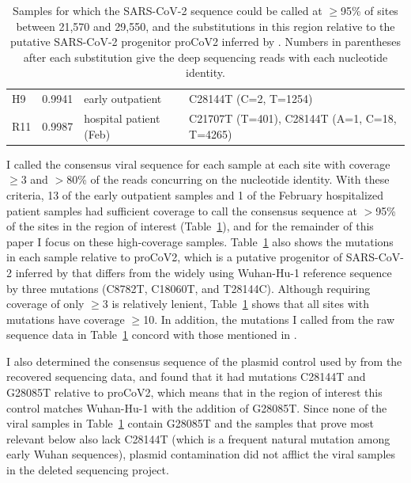 \documentclass[9pt,twocolumn,twoside]{gsajnl_modified}
\begin{document}
\begin{table}[]
{\begin{tabular}{lrll}
H9 &                               0.9941 &        early outpatient &                                                     C28144T (C=2, T=1254)  \\
R11 &                               0.9987 &  hospital patient (Feb) &                               C21707T (T=401), C28144T (A=1, C=18, T=4265)  \\
\bottomrule
\end{tabular}
}
\caption{Samples for which the SARS-CoV-2 sequence could be called at $\ge$95\% of sites between 21,570 and 29,550, and the substitutions in this region relative to the putative SARS-CoV-2 progenitor proCoV2 inferred by \citet{kumar2021evolutionary}.
Numbers in parentheses after each substitution give the deep sequencing reads with each nucleotide identity.
\label{tab:mutations}
}
\end{table}

I called the consensus viral sequence for each sample at each site with coverage $\ge$3 and $>$80\% of the reads concurring on the nucleotide identity.
With these criteria, 13 of the early outpatient samples and 1 of the February hospitalized patient samples had sufficient coverage to call the consensus sequence at $>$95\% of the sites in the region of interest (Table~\ref{tab:mutations}), and for the remainder of this paper I focus on these high-coverage samples.
Table~\ref{tab:mutations} also shows the mutations in each sample relative to proCoV2, which is a putative progenitor of SARS-CoV-2 inferred by \citet{kumar2021evolutionary} that differs from the widely using Wuhan-Hu-1 reference sequence by three mutations (C8782T, C18060T, and T28144C).
Although requiring coverage of only $\ge$3 is relatively lenient, Table~\ref{tab:mutations} shows that all sites with mutations have coverage $\ge$10.
In addition, the mutations I called from the raw sequence data in Table~\ref{tab:mutations} concord with those mentioned in \citet{wang2020small}.

I also determined the consensus sequence of the plasmid control used by \citet{wang2020medRxiv} from the recovered sequencing data, and found that it had mutations C28144T and G28085T relative to proCoV2, which means that in the region of interest this control matches Wuhan-Hu-1 with the addition of G28085T.
Since none of the viral samples in Table~\ref{tab:mutations} contain G28085T and the samples that prove most relevant below also lack C28144T (which is a frequent natural mutation among early Wuhan sequences), plasmid contamination did not afflict the viral samples in the deleted sequencing project.
\end{document}
